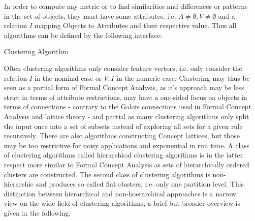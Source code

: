 In order to compute any metric or to find similarities and differences or patterns in the set of objects, they must have some attributes, i.e. $A \neq \emptyset, V \neq \emptyset$ and a relation $I$ mapping Objects to Atrributes and their respective value.
Thus all algorithms can be defined by the following interface:
\begin{algorithm}[h]
\caption{Clustering Algorithm}\label{clustering}
\end{algorithm}
Often clustering algorithms only consider feature vectors, i.e. only consider the relation $I$ in the nominal case or $V, I$ in the numeric case. Clustering may thus be seen as a partial form of Formal Concept Analysis, as it's approach may be less strict in terms of attribute restrictions, may have a one-sided focus on objects in terms of connections - contrary to the Galois connections used in Formal Concept Analysis and lattice theory - and partial as many clustering algorithms only split the input once into a set of subsets instead of exploring all sets for a given rule recursively.
There are also algorithms constructing Concept lattices, but those may be too restrictive for noisy applications and exponential in run time\cite{doi:10.1111/j.1467-8640.1995.tb00031.x}. A class of clustering algorithms called hierarchical clustering algorithms is in the latter respect more similar to Formal Concept Analysis as sets of hierarchically ordered clusters are constructed.
The second class of clustering algorithms is non-hierarchic and produces so called flat clusters, i.e. only one partition level. This distinction between hierarchical and non-hoerarchical approaches is a narrow view on the wide field of clustering algorithms, a brief but broader overview is given in the following.

